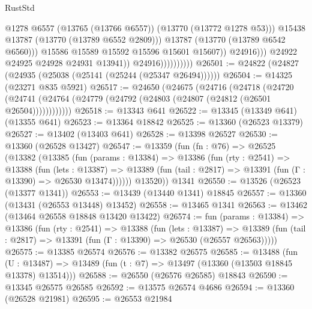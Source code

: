\begin{lexlean}{RustStd}
\begin{coremodule}
                                            @1278
                                            @6557
                                            (@13765 (@13766 @6557))
                                            (@13770 (@13772 @1278 @53)))
                                          @15438
                                          @13787
                                          (@13770 (@13789 @6552 @2809)))
                                        @13787
                                        (@13770 (@13789 @6542 @6560)))
                                      @15586
                                      @15589
                                      @15592
                                      @15596
                                      @15601
                                      @15607))
                                  @24916)))
                            @24922
                            @24925
                            @24928
                            @24931
                            @13941))
                        @24916))))))))))
@26501 := @24822 (@24827 (@24935 (@25038 (@25141 (@25244 (@25347 @26494))))))
@26504 := @14325 (@23271 @835 @5921)
@26517 := @24650
    (@24675
      (@24716
        (@24718
          (@24720 (@24741 (@24764 (@24779 (@24792 (@24803 (@24807 (@24812 (@26501 @26504))))))))))))
@26518 := @13343 @641
@26522 := @13345 (@13349 @641) (@13355 @641)
@26523 := @13364 @18842
@26525 := @13360 (@26523 @13379)
@26527 := @13402 (@13403 @641)
@26528 := @13398 @26527
@26530 := @13360 (@26528 @13427)
@26547 := @13359
    (fun (fn : @76) =>
    @26525
      (@13382
        (@13385
          (fun (params : @13384) =>
          @13386
            (fun (rty : @2541) =>
            @13388
              (fun (lets : @13387) =>
              @13389 (fun (tail : @2817) => @13391 (fun (Γ : @13390) => @26530 @13474))))))
        @13520))
    @1341
@26550 := @13526 (@26523 (@13377 @1341))
@26553 := @13439 (@13440 @1341) @18845
@26557 := @13360 (@13431 (@26553 @13448) @13452)
@26558 := @13465 @1341
@26563 := @13462 (@13464 @26558 @18848 @13420 @13422)
@26574 := fun (params : @13384) =>
  @13386
    (fun (rty : @2541) =>
    @13388
      (fun (lets : @13387) =>
      @13389 (fun (tail : @2817) => @13391 (fun (Γ : @13390) => @26530 (@26557 @26563)))))
@26575 := @13385 @26574
@26576 := @13382 @26575
@26585 := @13488
    (fun (U : @13487) => @13489 (fun (t : @7) => @13497 (@13360 (@13503 @18845 @13378) @13514)))
@26588 := @26550 (@26576 @26585) @18843
@26590 := @13345 @26575 @26585
@26592 := @13575 @26574 @4686
@26594 := @13360 (@26528 @21981)
@26595 := @26553 @21984

\end{coremodule}
\end{lexlean}
